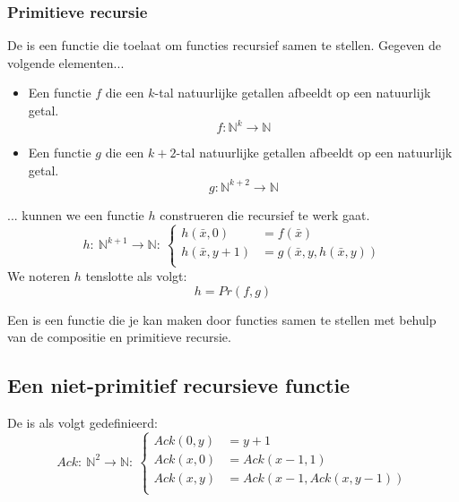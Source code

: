 \documentclass[main.tex]{subfiles}
\begin{document}
\subsubsection{Primitieve recursie}
\label{sec:primitieve-recursie}

\begin{de}
  De  is een functie die toelaat om functies recursief samen te stellen.
  Gegeven de volgende elementen...
  \begin{itemize}
  \item Een functie $f$ die een $k$-tal natuurlijke getallen afbeeldt op een natuurlijk getal.
    \[ f: \mathbb{N}^{k} \rightarrow \mathbb{N} \]
  \item Een functie $g$ die een $k+2$-tal natuurlijke getallen afbeeldt op een natuurlijk getal.
    \[ g: \mathbb{N}^{k+2} \rightarrow \mathbb{N} \]
  \end{itemize}
  ... kunnen we een functie $h$ construeren die recursief te werk gaat.
  \[ 
  h:\ \mathbb{N}^{k+1} \rightarrow \mathbb{N}:\ 
  \left\{
    \begin{array}{ll}
      h(\bar{x},0) &= f(\bar{x})\\
      h(\bar{x},y+1) &= g(\bar{x}, y, h(\bar{x},y))\\
    \end{array}
  \right.
  \]
  We noteren $h$ tenslotte als volgt:
  \[ h = Pr(f,g) \]
\end{de}

\begin{de}
  Een  is een functie die je kan maken door functies samen te stellen met behulp van de compositie en primitieve recursie.
\end{de}

\subsection{Een niet-primitief recursieve functie}
\label{sec:een-niet-primitief}

\begin{de}
  De  is als volgt gedefinieerd:
  \[ 
  Ack:\ \mathbb{N}^{2} \rightarrow \mathbb{N}:\ 
  \left\{
    \begin{array}{llll}
      Ack(0,y)   &= y+1\\
      Ack(x,0)   &= Ack(x-1,1)\\
      Ack(x,y)   &= Ack(x-1,Ack(x,y-1))\\
    \end{array}
  \right.
  \]
\end{de}
\end{document}
